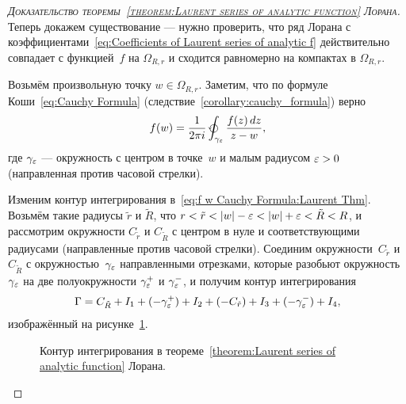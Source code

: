 \documentclass[../complex-analysis.tex]{subfiles}
\begin{document}
\begin{proof}[\normalfont\textsc{Доказательство теоремы~\ref{theorem:Laurent series of analytic function} Лорана}]
 Теперь докажем существование --- нужно проверить, что ряд Лорана с коэффициентами~\eqref{eq:Coefficients of Laurent series of analytic f} действительно совпадает с функцией~$ f $ на $ \Omega_{R,r} $ и сходится равномерно на компактах в $ \Omega_{R,r} $.

 Возьмём произвольную точку $ w \in \Omega_{R,r} $. Заметим, что по формуле Коши~\eqref{eq:Cauchy Formula} (следствие~\ref{corollary:cauchy_formula}) верно
 \begin{align}
  \label{eq:f w Cauchy Formula:Laurent Thm}
  f(w) = \frac{1}{2\pi i}\varointctrclockwise_{\gamma_\eps} \frac{f(z)\,dz}{z - w},
 \end{align} где $ \gamma_\varepsilon $ --- окружность с центром в точке~$ w $ и малым радиусом $ \varepsilon > 0 $ (направленная против часовой стрелки).

 Изменим контур интегрирования в~\eqref{eq:f w Cauchy Formula:Laurent Thm}. Возьмём такие радиусы $ \tilde r $ и $ \tilde R $, что $ r < \tilde r < \left| w \right| - \varepsilon < \left| w \right| + \varepsilon < \tilde R < R $, и рассмотрим окружности $ C_{\tilde r} $ и $ C_{\tilde R} $ с центром в нуле и соответствующими радиусами (направленные против часовой стрелки). Соединим окружности~$ C_{\tilde r} $ и $ C_{\tilde R} $ с окружностью~$ \gamma_\varepsilon $ направленными отрезками, которые разобьют окружность~$ \gamma_\varepsilon $ на две полуокружности $ \gamma_\varepsilon^{+} $ и $ \gamma_\varepsilon^{-} $, и получим контур интегрирования
 \begin{align*}
  \Gamma = C_{\tilde R} + I_1 + (-\gamma_\varepsilon^{+}) + I_2 + (-C_{\tilde r}) + I_3 + (-\gamma_\varepsilon^{-}) + I_4,
 \end{align*} изображённый на рисунке~\ref{fig:laurent-series-point-surgery}.

 \begin{figure}[ht]
  \centering
  \caption{Контур интегрирования в теореме~\ref{theorem:Laurent series of analytic function} Лорана.}
  \label{fig:laurent-series-point-surgery}
 \end{figure}


\end{proof}
\end{document}
